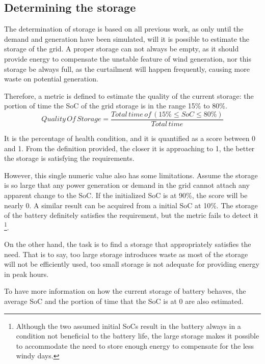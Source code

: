 \documentclass[12pt,a4paper]{report}
\begin{document}
            \subsection{Determining the storage}
            \label{text_determine_storage}
            The determination of storage is based on all previous work, as only until the demand and generation have been simulated, will it is possible to estimate the storage of the grid. A proper storage can not always be empty, as it should provide energy to compensate the unstable feature of wind generation, nor this storage be always full, as the curtailment will happen frequently, causing more waste on potential generation. 
            
            Therefore, a metric is defined to estimate the quality of the current storage: the portion of time the SoC of the grid storage is in the range 15\% to 80\%. 
            \begin{equation}
                Quality\, Of\, Storage = \frac{Total \, time\, of \, (15\% \leq SoC \leq 80\%)}{Total \, time}
            \end{equation}

            It is the percentage of health condition, and it is quantified as a score between 0 and 1. From the definition provided, the closer it is approaching to 1, the better the storage is satisfying the requirements.

            However, this single numeric value also has some limitations. Assume the storage is so large that any power generation or demand in the grid cannot attach any apparent change to the SoC. If the initialized SoC is at 90\%, the score will be nearly 0. A similar result can be acquired from a initial SoC at 10\%. The storage of the battery definitely satisfies the requirement, but the metric fails to detect it \footnote{Although the two assumed initial SoCs result in the battery always in a condition not beneficial to the battery life, the large storage makes it possible to accommodate the need to store enough energy to compensate for the less windy days.}.

            On the other hand, the task is to find a storage that appropriately satisfies the need. That is to say, too large storage introduces waste as most of the storage will not be efficiently used, too small storage is not adequate for providing energy in peak hours.

            To have more information on how the current storage of battery behaves, the average SoC and the portion of time that the SoC is at 0 are also estimated.
\end{document}
